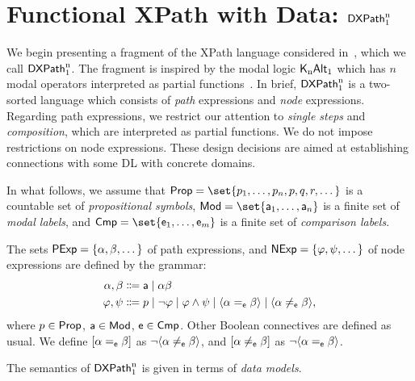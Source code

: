 \section{Functional XPath with Data: $\mathsf{DXPath}_{\rm 1}^{\rm n}$} 
\label{sec:dxpath-f}

We begin presenting a fragment of the XPath language considered in~\cite{ICDT14Jair,KR16,AbriolaDFF17,AbriolaBFF18}, which we call $\mathsf{DXPath}_{\rm 1}^{\rm n}$. The fragment is inspired by the modal logic $\mathsf{K}_{\rm n}\mathsf{Alt}_{\rm 1}$ which has $n$ modal operators interpreted as partial functions~\cite{blackburn2001modal}. 
In brief, $\mathsf{DXPath}_{\rm 1}^{\rm n}$ is a two-sorted language which consists of  \emph{path} expressions and \emph{node} expressions.
Regarding path expressions, we restrict our attention to \emph{single steps} and \emph{composition}, which are interpreted as partial functions.  
We do not impose restrictions on node expressions.
These design decisions are aimed at establishing connections with some DL with concrete domains. 

In what follows, we assume that $\props = \set{p_1, \dots, p_n, p, q, r, \dots}$ is a countable set of \emph{propositional symbols}, $\mods=\set{\apath_1, \dots, \apath_n}$ is a finite set of \emph{modal labels}, and $\cmps = \set{\cmp_1, \dots, \cmp_m}$ is a finite set of \emph{comparison labels}. 

\begin{definition} [Language]\label{def:xpath:lang}
    The sets $\mathsf{PExp} = \{\alpha, \beta, \dots \}$ of path expressions, and $\mathsf{NExp} = \{\varphi, \psi, \dots \}$ of node expressions are defined by the grammar:
    \begin{align*}
        \alpha, \beta & \Coloneqq
            \mathsf{a} \mid
            \alpha \beta  \\
        \varphi, \psi & \Coloneqq
            p \mid
            \lnot \varphi \mid
            \varphi \land \psi \mid
            \langle{\alpha =_{\mathsf{e}}\beta}\rangle \mid
            \langle{\alpha \neq_{\mathsf{e}}\beta}\rangle,
      \end{align*}
     where $p \in \mathsf{Prop}$, $\mathsf{a} \in \mathsf{Mod}$, $\mathsf{e} \in \mathsf{Cmp}$. Other Boolean connectives are defined as usual. We define $[\alpha=_{\mathsf{e}}\beta]$ as $\neg\langle{\alpha\neq_{\mathsf{e}}\beta}\rangle$, and $[\alpha\neq_{\mathsf{e}}\beta]$ as $\neg\langle{\alpha=_{\mathsf{e}}\beta}\rangle$. 
\end{definition}

The semantics of $\mathsf{DXPath}_{\rm 1}^{\rm n}$ is given in terms of \emph{data models}.

